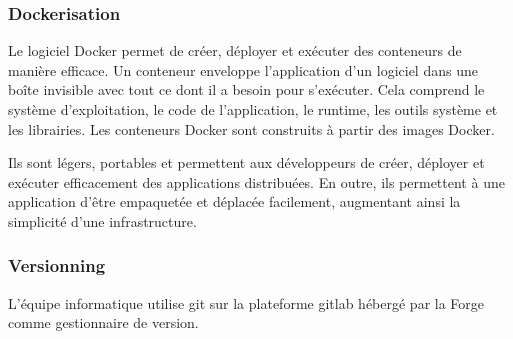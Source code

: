 \documentclass[a4paper]{article}
\begin{document}
\subsubsection{Dockerisation}

Le logiciel Docker permet de créer, déployer et exécuter des conteneurs de manière efficace. Un conteneur enveloppe l’application d’un logiciel dans une boîte invisible avec tout ce dont il a besoin pour s’exécuter. Cela comprend le
système d’exploitation, le code de l’application, le runtime, les outils système et les librairies. Les conteneurs Docker sont construits à partir des images Docker.

Ils sont légers, portables et permettent aux développeurs de créer, déployer et exécuter efficacement des applications distribuées. En outre, ils permettent à une application d’être empaquetée et déplacée facilement, augmentant ainsi la simplicité d’une infrastructure.

\subsubsection{Versionning}

L'équipe informatique utilise git sur la plateforme gitlab hébergé par la Forge comme gestionnaire de version. 
\end{document}
